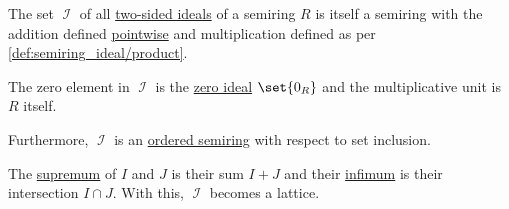 \begin{proposition}\label{thm:semiring_of_ideals}
  \hfill
  \begin{thmenum}
     The set \( \mscrI \) of all \hyperref[def:semiring_ideal]{two-sided ideals} of a semiring \( R \) is itself a semiring with the addition defined \hyperref[def:power_semigroup]{pointwise} and multiplication defined as per \cref{def:semiring_ideal/product}.

    The zero element in \( \mscrI \) is the \hyperref[def:semiring_ideal/zero]{zero ideal} \( \set{ 0_R } \) and the multiplicative unit is \( R \) itself.

     Furthermore, \( \mscrI \) is an \hyperref[def:ordered_semiring]{ordered semiring} with respect to set inclusion.

     The \hyperref[def:extremal_points/supremum_and_infimum]{supremum} of \( I \) and \( J \) is their sum \( I + J \) and their \hyperref[def:extremal_points/supremum_and_infimum]{infimum} is their intersection \( I \cap J \). With this, \( \mscrI \) becomes a lattice.
  \end{thmenum}
\end{proposition}
